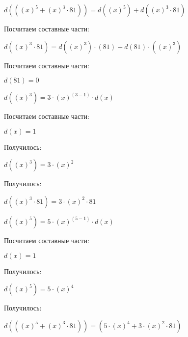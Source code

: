 $ d(((x)^5+(x)^3 \cdot 81)) = d((x)^5) + d((x)^3 \cdot 81)$

Посчитаем составные части:

$ d((x)^3 \cdot 81) = d((x)^3) \cdot (81) + d(81) \cdot ((x)^3)$

Посчитаем составные части:

$ d(81) = 0$

$ d((x)^3) = 3 \cdot (x)^(3 - 1) \cdot d(x)$

Посчитаем составные части:

$ d(x) = 1$

Получилось:

$ d((x)^3) = 3 \cdot (x)^2$

Получилось:

$ d((x)^3 \cdot 81) = 3 \cdot (x)^2 \cdot 81$

$ d((x)^5) = 5 \cdot (x)^(5 - 1) \cdot d(x)$

Посчитаем составные части:

$ d(x) = 1$

Получилось:

$ d((x)^5) = 5 \cdot (x)^4$

Получилось:

$ d(((x)^5+(x)^3 \cdot 81)) = (5 \cdot (x)^4+3 \cdot (x)^2 \cdot 81)$

